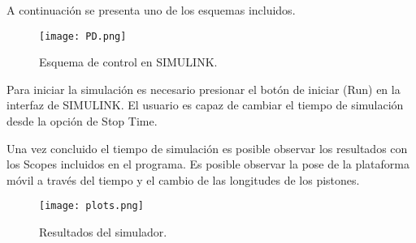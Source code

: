 A continuación se presenta uno de los esquemas incluidos.

\begin{figure}[htb!]
\centering
 \texttt{[image: PD.png]}
 \caption{Esquema de control en SIMULINK.}
\end{figure}

Para iniciar la simulación es necesario 
presionar el botón de iniciar (Run) 
en la interfaz de SIMULINK.
El usuario es capaz de cambiar el tiempo de 
simulación desde la opción de Stop Time.

Una vez concluido el tiempo de simulación es 
posible observar los resultados con los 
Scopes incluidos en el programa.
Es posible observar la pose de la plataforma móvil
a través del tiempo y el cambio de las longitudes de los pistones.

\begin{figure}[htb!]
 \centering
 \texttt{[image: plots.png]}
 \caption{Resultados del simulador.}
\end{figure}



